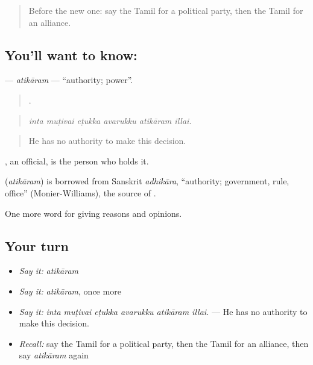 \label{lesson:TA-C375-atikaram}



\begin{quote}
Before the new one: say the Tamil for a political party, then the Tamil for an alliance.
\end{quote}

\subsection*{You'll want to know: }
\textbf{} — \emph{atikāram} — \textquotedblleft{}authority; power\textquotedblright{}.

\begin{quote}
     .
\end{quote}

\begin{quote}
\emph{inta muṭivai eṭukka avarukku atikāram illai.}
\end{quote}

\begin{quote}
He has no authority to make this decision.
\end{quote}

, an official, is the person who holds it.

\begin{cousinweb}
\textbf{} (\emph{atikāram}) is borrowed from Sanskrit \emph{adhikāra}, \textquotedblleft{}authority; government, rule, office\textquotedblright{} (Monier-Williams), the source of .
\end{cousinweb}

\begin{grammarlens}[title={What you've built}]
One more word for giving reasons and opinions.
\end{grammarlens}

\subsection*{Your turn}
\begin{itemize}
\raggedright
  \item \emph{Say it:} \emph{atikāram}
  \item \emph{Say it:} \emph{atikāram}, once more
  \item \emph{Say it:} \emph{inta muṭivai eṭukka avarukku atikāram illai.} — He has no authority to make this decision.
  \item \emph{Recall:} say the Tamil for a political party, then the Tamil for an alliance, then say \emph{atikāram} again
\end{itemize}

